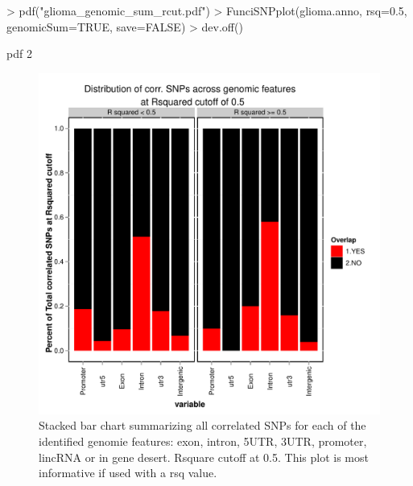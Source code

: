 \documentclass[12pt,fullpage]{article}
\begin{document}
\begin{Schunk}
\begin{Sinput}
> pdf("glioma_genomic_sum_rcut.pdf")                                               
> FunciSNPplot(glioma.anno, rsq=0.5, genomicSum=TRUE, save=FALSE)                  
> dev.off()                                                                        
\end{Sinput}
\begin{Soutput}
pdf 
  2 
\end{Soutput}
\end{Schunk}
                                                                                 
\begin{figure}[ht!]                                                              
\begin{center}                                                                   
\includegraphics{glioma_genomic_sum_rcut.pdf}                                    
\caption{\label{fig:glioma_genomic_sum_rcut.pdf} Stacked bar chart summarizing   
    all correlated SNPs for each of the identified genomie features: exon,
        intron,   
        5UTR, 3UTR, promoter, lincRNA or in gene desert. Rsquare cutoff                  
             at 0.5. This plot is most informative if used with a rsq value.}                
{\footnotesize{}}                                                                
\end{center}                                                                     
\end{figure}                                                                     
                                                                                 
\end{document}
